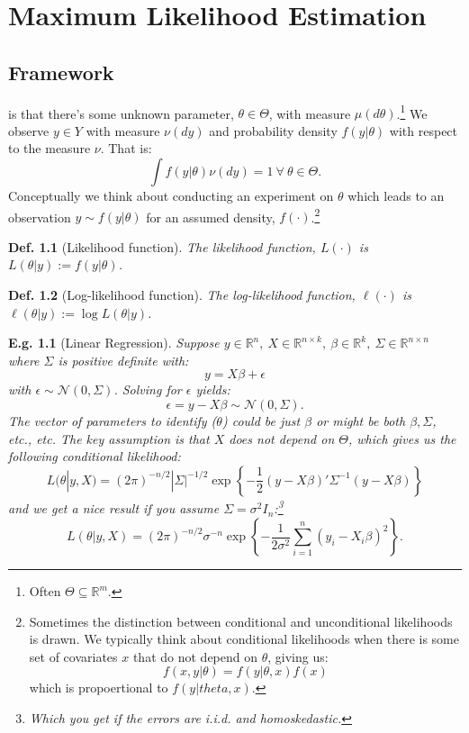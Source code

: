 \documentclass{tufte-book}
\theoremstyle{mytheoremstyle}
\theoremstyle{mylemstyle}
\theoremstyle{mydefstyle}
\newtheorem*{mydef}{Def.}
\newtheorem*{ex}{E.g.}
\begin{document}
\chapter{Maximum Likelihood Estimation}
\section{Framework}
 is that there's some unknown parameter, \(\theta \in \Theta\), with measure \(\mu(d\theta)\).\footnote{Often \(\Theta \subseteq \mathbb{R}^m\).} We observe \(y \in Y\) with measure \(\nu(dy)\) and probability density \(f(y|\theta)\) with respect to the measure \(\nu\). That is:
	\[\int f(y|\theta)\nu(dy) = 1\ \forall\ \theta \in \Theta\text{.}\]
Conceptually we think about conducting an experiment on \(\theta\) which leads to an observation \(y \sim f(y|\theta)\) for an assumed density, \(f(\cdot)\).\footnote{Sometimes the distinction between conditional and unconditional likelihoods is drawn. We typically think about conditional likelihoods when there is some set of covariates \(x\) that do not depend on \(\theta\), giving us:
	\[f(x, y | \theta) = f(y| \theta, x)f(x)\]
which is propoertional to \(f(y|theta, x)\). }
\begin{mydef}[Likelihood function] The likelihood function, \(L(\cdot)\) is \(L(\theta | y) := f(y|\theta)\). \end{mydef}
\begin{mydef}[Log-likelihood function] The log-likelihood function, \(\ell(\cdot)\) is \(\ell(\theta | y) := \log L(\theta| y)\). \end{mydef}
\begin{ex}[Linear Regression] Suppose \(y \in \mathbb{R}^n,\ X \in \mathbb{R}^{n\times k},\ \beta \in \mathbb{R}^k,\ \Sigma \in \mathbb{R}^{n \times n}\) where \(\Sigma\) is positive definite with:
	\[y = X\beta + \epsilon\]
with \(\epsilon \sim \mathcal{N}(0, \Sigma)\). Solving for \(\epsilon\) yields:
	\[\epsilon = y-X\beta \sim \mathcal{N}(0, \Sigma) \text{.}\]
The vector of parameters to identify (\(\theta\)) could be just \(\beta\) or might be both \(\beta, \Sigma\), etc., etc. The key assumption is that \(X\) does not depend on \(\Theta\), which gives us the following conditional likelihood:
	\[L(\theta| y, X) = (2\pi)^{-n/2}|\Sigma|^{-1/2} \exp\left\{ -\frac{1}{2}(y - X\beta)'\Sigma^{-1}(y-X\beta) \right\}\]
and we get a nice result if you assume \(\Sigma = \sigma^2 I_n\):\footnote{Which you get if the errors are i.i.d. and homoskedastic.} 
	\[L(\theta|y, X) = (2\pi)^{-n/2}\sigma^{-n} \exp\left\{-\frac{1}{2\sigma^2}\sum_{i=1}^n (y_i - X_i \beta)^2 \right\} \text{.}\]
\end{ex}
\end{document}
